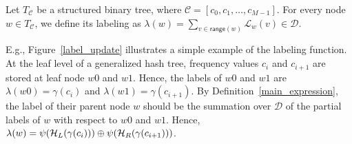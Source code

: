\begin{defn}\label{main_expression}
Let $T_\mathcal{C}$ be a structured binary tree, where $\mathcal{C}=[c_0, c_1, \ldots,c_{M-1}]$. For every node $w\in T_{\mathcal{C}}$, we define its labeling as $\lambda(w) ={\sum_{v\in \mathsf{range}(w)}} \mathcal{L}_w(v) \in {\mathcal{D}}$.
\end{defn}

E.g., Figure~\ref{label_update} illustrates a simple example of the labeling function. At the leaf level of a generalized hash tree, frequency values $c_{i}$ and $c_{i+1}$ are stored at leaf node $w0$ and $w1$. Hence, the labels of $w0$ and $w1$ are $\lambda(w0) = \gamma(c_{i})$ and $\lambda(w1) = \gamma(c_{i+1})$. By Definition~\ref{main_expression}, the label of their parent node $w$ should be the summation over ${\mathcal{D}}$ of the partial labels of $w$ with respect to $w0$ and $w1$. Hence, $\lambda(w) = \psi ( {\cal H}_{L} ( \gamma (c_{i})))  \oplus \psi ( {\cal H}_{R} ( \gamma (c_{i+1}) ))$.




